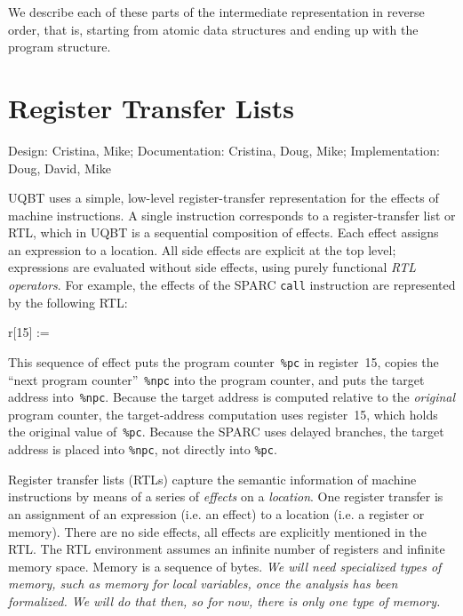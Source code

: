 We describe each of these parts of the intermediate representation
in reverse order, that is, starting from atomic data structures
and ending up with the program structure.



\section{Register Transfer Lists}
\label{sec-rtl}

{\small
\begin{flushright}
Design: Cristina, Mike; Documentation: Cristina, Doug, Mike;
 Implementation: Doug, David, Mike
\end{flushright} 
}

UQBT uses a simple, low-level register-transfer representation for the
effects of machine instructions.
A single instruction corresponds to a register-transfer list or RTL,
which in UQBT is a sequential composition of effects.
Each effect assigns an expression to a location.
All side effects are explicit at the top level;
expressions are evaluated without side effects, using purely
functional \emph{RTL operators}.
For example, the effects of the SPARC \texttt{call} instruction are
represented by the following RTL:

\begin{smallverbatim}
r[15] := %
\end{smallverbatim}
This sequence of effect puts the program counter~\texttt{\%pc} in
register~15, copies the ``next program counter''~\texttt{\%npc} into
the program counter, and puts the target address into~\texttt{\%npc}.
Because the target address is computed relative to the \emph{original}
program counter, the target-address computation uses register~15,
which holds the original value of~\texttt{\%pc}.
Because the SPARC uses delayed branches,  the target address
is placed into \texttt{\%npc}, not directly into \texttt{\%pc}.

Register transfer lists (RTLs) capture the semantic information 
of machine instructions by means of a series of \emph{effects} on a 
\emph{location}.
One register transfer is an assignment of an expression (i.e. an 
effect) to a location (i.e. a register or memory).  
There are no side effects, all effects are explicitly mentioned in 
the RTL.
The RTL environment assumes an infinite number of registers and
infinite memory space.  Memory is a sequence of bytes.  
{\it We will need specialized types of memory, such as memory for 
local variables, once the analysis has been formalized.   We
will do that then, so for now, there is only one type of memory. }

